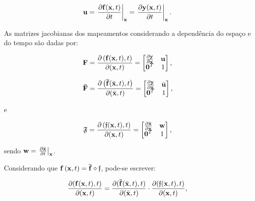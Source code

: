 \documentclass[tese_patricia]{subfiles}%
\begin{document}
\begin{align}
	\mathbf{u} = \left. \frac{\partial \mathbf{f}(\mathbf{x},t)}{\partial t} \right|_{\mathbf{x}} = \left. \frac{\partial \mathbf{y}(\mathbf{x},t)}{\partial t} \right|_{\mathbf{x}}.
\end{align}


As matrizes jacobianas dos mapeamentos considerando a dependência do espaço e do tempo são dadas por:

\begin{equation} 
	\mathbf{F} = \frac{\partial \left(\mathbf{f}(\mathbf{x},t),t\right)}{\partial (\mathbf{x},t)}=
	\begin{bmatrix}
		\frac{\partial {\mathbf{y}}}{\partial {\mathbf{x}}} & \mathbf{u} \\
		\mathbf{0}^T & 1 \\
	\end{bmatrix}
	\text{,}
\end{equation}

\begin{equation} 
	\mathbf{\bar{F}} = \frac{\partial \left(\mathbf{\bar{f}}(\bar{\mathbf{x}},t),t\right)}{\partial (\bar{\mathbf{x}},t)}=
	\begin{bmatrix}
		\frac{\partial {\mathbf{y}}}{\partial {\bar{\mathbf{x}}}} & \bar{\mathbf{u}} \\
		\mathbf{0}^T & 1 \\
	\end{bmatrix}
	\text{,}
\end{equation}

e

\begin{equation}
	\mathfrak{F} = \frac{\partial \left({\mathfrak{f}}(\mathbf{x},t),t\right)}{\partial (\mathbf{x},t)}=
	\begin{bmatrix}
		\frac{\partial {\bar{\mathbf{x}}}}{\partial {\mathbf{x}}} & \mathbf{w} \\
		\mathbf{0}^T & 1 \\
	\end{bmatrix}
	\text{,}
\end{equation}

\noindent sendo $\mathbf{w} = \left. \frac{\partial \bar{\mathbf{x}}}{\partial t} \right|_{\mathbf{x}}$.


Considerando que $\mathbf{f}\left(\mathbf{x},t\right) = \mathbf{\bar{f}} \circ \mathfrak{f}$, pode-se escrever:

\begin{align}
	\frac{\partial(\mathbf{f}(\mathbf{x},t),t)}{\partial(\mathbf{x},t)} = \frac{\partial(\mathbf{\bar{f}}(\bar{\mathbf{x}},t),t)}{\partial(\bar{\mathbf{x}},t)} \cdot \frac{\partial(\mathfrak{f}(\mathbf{x},t),t)}{\partial(\mathbf{x},t)},
\end{align}
\end{document}
